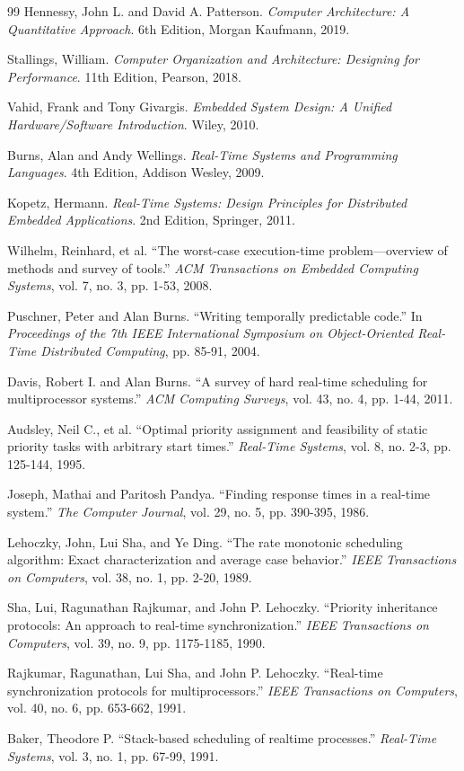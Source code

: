 \begin{thebibliography}{99}
Hennessy, John L. and David A. Patterson.
\textit{Computer Architecture: A Quantitative Approach}.
6th Edition, Morgan Kaufmann, 2019.

Stallings, William.
\textit{Computer Organization and Architecture: Designing for Performance}.
11th Edition, Pearson, 2018.

Vahid, Frank and Tony Givargis.
\textit{Embedded System Design: A Unified Hardware/Software Introduction}.
Wiley, 2010.

Burns, Alan and Andy Wellings.
\textit{Real-Time Systems and Programming Languages}.
4th Edition, Addison Wesley, 2009.

Kopetz, Hermann.
\textit{Real-Time Systems: Design Principles for Distributed Embedded Applications}.
2nd Edition, Springer, 2011.

Wilhelm, Reinhard, et al.
``The worst-case execution-time problem—overview of methods and survey of tools.''
\textit{ACM Transactions on Embedded Computing Systems}, vol. 7, no. 3, pp. 1-53, 2008.

Puschner, Peter and Alan Burns.
``Writing temporally predictable code.''
In \textit{Proceedings of the 7th IEEE International Symposium on Object-Oriented Real-Time Distributed Computing}, pp. 85-91, 2004.

Davis, Robert I. and Alan Burns.
``A survey of hard real-time scheduling for multiprocessor systems.''
\textit{ACM Computing Surveys}, vol. 43, no. 4, pp. 1-44, 2011.

Audsley, Neil C., et al.
``Optimal priority assignment and feasibility of static priority tasks with arbitrary start times.''
\textit{Real-Time Systems}, vol. 8, no. 2-3, pp. 125-144, 1995.

Joseph, Mathai and Paritosh Pandya.
``Finding response times in a real-time system.''
\textit{The Computer Journal}, vol. 29, no. 5, pp. 390-395, 1986.

Lehoczky, John, Lui Sha, and Ye Ding.
``The rate monotonic scheduling algorithm: Exact characterization and average case behavior.''
\textit{IEEE Transactions on Computers}, vol. 38, no. 1, pp. 2-20, 1989.

Sha, Lui, Ragunathan Rajkumar, and John P. Lehoczky.
``Priority inheritance protocols: An approach to real-time synchronization.''
\textit{IEEE Transactions on Computers}, vol. 39, no. 9, pp. 1175-1185, 1990.

Rajkumar, Ragunathan, Lui Sha, and John P. Lehoczky.
``Real-time synchronization protocols for multiprocessors.''
\textit{IEEE Transactions on Computers}, vol. 40, no. 6, pp. 653-662, 1991.

Baker, Theodore P.
``Stack-based scheduling of realtime processes.''
\textit{Real-Time Systems}, vol. 3, no. 1, pp. 67-99, 1991.

\end{thebibliography}